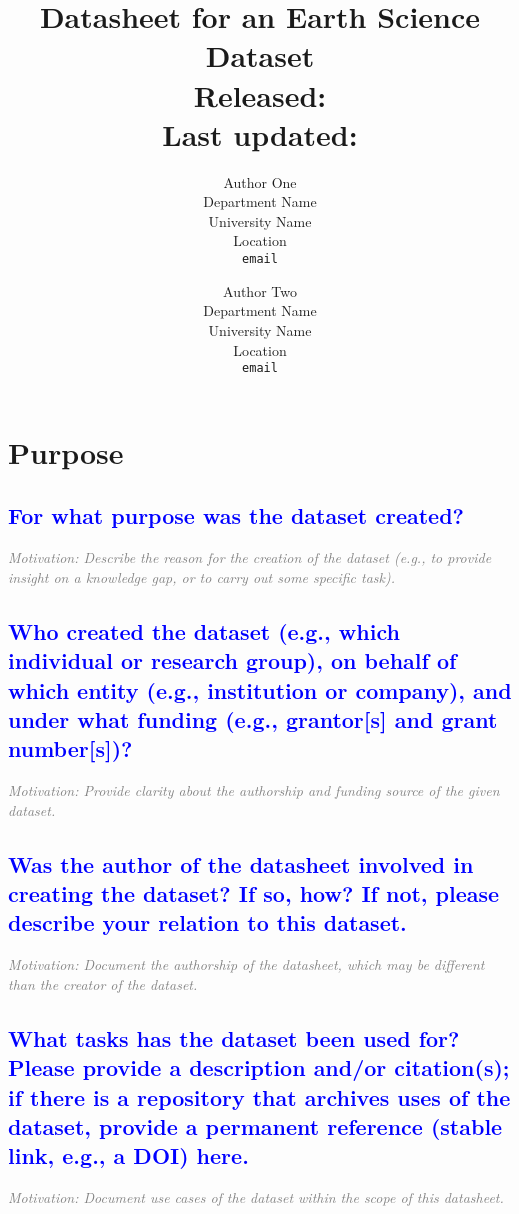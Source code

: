 \documentclass[letterpaper, 10 pt, transmag]{IEEEtran}
\title{
\LARGE \textbf{Datasheet for an Earth Science Dataset}
\\ \normalsize Released: %
\\ \footnotesize Last updated: %
}
\author{ Author One \\
	Department Name \\
	University Name \\
	Location \\
	\texttt{email} \\
	\and
	Author Two \\
	Department Name \\
	University Name \\
	Location \\
	\texttt{email} \\
}
\begin{document}
\maketitle
\thispagestyle{fancy}
\pagestyle{fancy}
\section{Purpose}

\textcolor{blue}{\subsection{For what purpose was the dataset created?}}
\textcolor{gray}{\textit{Motivation: Describe the reason for the creation of the dataset (e.g., to provide insight on a knowledge gap, or to carry out some specific task).}}

\textcolor{blue}{\subsection{Who created the dataset (e.g., which individual or research group), on behalf of which entity (e.g., institution or company), and under what funding (e.g., grantor[s] and grant number[s])?}}
\textcolor{gray}{\textit{Motivation: Provide clarity about the authorship and funding source of the given dataset.}}

\textcolor{blue}{\subsection{Was the author of the datasheet involved in creating the dataset? If so, how? If not, please describe your relation to this dataset.}}
\textcolor{gray}{\textit{Motivation: Document the authorship of the datasheet, which may be different than the creator of the dataset.}}

\textcolor{blue}{\subsection{What tasks has the dataset been used for? Please provide a description and/or citation(s); if there is a repository that archives uses of the dataset, provide a permanent reference (stable link, e.g., a DOI) here.}}
\textcolor{gray}{\textit{Motivation: Document use cases of the dataset within the scope of this datasheet.}}
\end{document}
